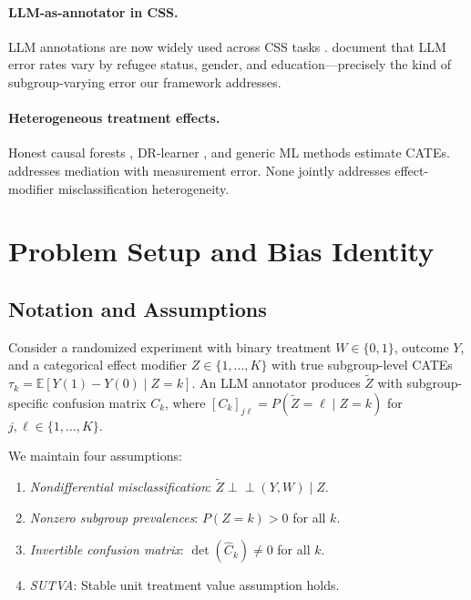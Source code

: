 \documentclass[11pt,a4paper]{article}
\newcommand{\E}{\mathbb{E}}
\begin{document}
\paragraph{LLM-as-annotator in CSS.}
LLM annotations are now widely used across CSS tasks \citep{gilardi2023chatgpt,tornberg2024chatgpt,ziems2024can}.
\citet{ashwin2025using} document that LLM error rates vary by refugee status, gender, and education---precisely the kind of subgroup-varying error our framework addresses.

\paragraph{Heterogeneous treatment effects.}
Honest causal forests \citep{wager2018estimation,athey2019generalized}, DR-learner \citep{kennedy2023towards}, and generic ML methods \citep{chernozhukov2018double} estimate CATEs.
\citet{imai2010causal} addresses mediation with measurement error.
None jointly addresses effect-modifier misclassification heterogeneity.


\section{Problem Setup and Bias Identity}

\subsection{Notation and Assumptions}

Consider a randomized experiment with binary treatment $W \in \{0,1\}$, outcome $Y$, and a categorical effect modifier $Z \in \{1, \ldots, K\}$ with true subgroup-level CATEs $\tau_k = \E[Y(1) - Y(0) \mid Z = k]$.
An LLM annotator produces $\tilde{Z}$ with subgroup-specific confusion matrix $C_k$, where $[C_k]_{j\ell} = P(\tilde{Z} = \ell \mid Z = k)$ for $j, \ell \in \{1, \ldots, K\}$.

We maintain four assumptions:
\begin{enumerate}[nosep,label=\textbf{A\arabic*}]
\item \emph{Nondifferential misclassification}: $\tilde{Z} \perp\!\!\!\perp (Y, W) \mid Z$.
\item \emph{Nonzero subgroup prevalences}: $P(Z = k) > 0$ for all $k$.
\item \emph{Invertible confusion matrix}: $\det(\hat{C}_k) \neq 0$ for all $k$.
\item \emph{SUTVA}: Stable unit treatment value assumption holds.
\end{enumerate}
\end{document}
